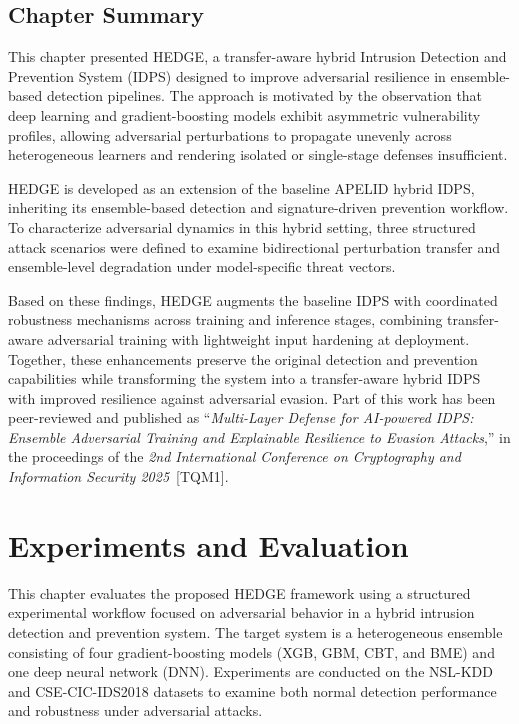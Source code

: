 \documentclass[12pt, a4paper, reqno, oneside]{book}
\begin{document}
\section{Chapter Summary}

This chapter presented HEDGE, a transfer-aware hybrid Intrusion Detection and Prevention System (IDPS) designed to improve adversarial resilience in ensemble-based detection pipelines. The approach is motivated by the observation that deep learning and gradient-boosting models exhibit asymmetric vulnerability profiles, allowing adversarial perturbations to propagate unevenly across heterogeneous learners and rendering isolated or single-stage defenses insufficient.

HEDGE is developed as an extension of the baseline APELID hybrid IDPS, inheriting its ensemble-based detection and signature-driven prevention workflow. To characterize adversarial dynamics in this hybrid setting, three structured attack scenarios were defined to examine bidirectional perturbation transfer and ensemble-level degradation under model-specific threat vectors.

Based on these findings, HEDGE augments the baseline IDPS with coordinated robustness mechanisms across training and inference stages, combining transfer-aware adversarial training with lightweight input hardening at deployment. Together, these enhancements preserve the original detection and prevention capabilities while transforming the system into a transfer-aware hybrid IDPS with improved resilience against adversarial evasion. Part of this work has been peer-reviewed and published as 
``\textit{Multi-Layer Defense for AI-powered IDPS: Ensemble Adversarial Training and Explainable Resilience to Evasion Attacks},'' 
in the proceedings of the \textit{2nd International Conference on Cryptography and Information Security 2025}~[TQM1].




\chapter{Experiments and Evaluation}
\label{chap:experiments}

This chapter evaluates the proposed HEDGE framework using a structured experimental workflow focused on adversarial behavior in a hybrid intrusion detection and prevention system. The target system is a heterogeneous ensemble consisting of four gradient-boosting models (XGB, GBM, CBT, and BME) and one deep neural network (DNN). Experiments are conducted on the NSL-KDD and CSE-CIC-IDS2018 datasets to examine both normal detection performance and robustness under adversarial attacks.
\end{document}
